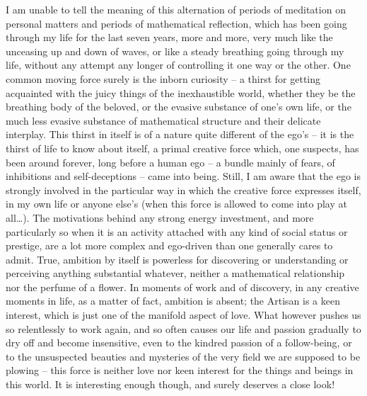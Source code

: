 I am unable to tell the meaning of this alternation of periods of
meditation on personal matters and periods of mathematical reflection,
which has been going through my life for the last seven years, more
and more, very much like the unceasing up and down of waves, or like a
steady breathing going through my life, without any attempt any longer
of controlling it one way or the other. One common moving force surely
is the inborn curiosity -- a thirst for getting acquainted with the
juicy things of the inexhaustible world, whether they be the breathing
body of the beloved, or the evasive substance of one's own life, or
the much less evasive substance of mathematical structure and their
delicate interplay. This thirst in itself is of a nature quite
different of the ego's -- it is the thirst of life to know about
itself, a primal creative force which, one suspects, has been around
forever, long before a human ego -- a bundle mainly of fears, of
inhibitions and self-deceptions -- came into being. Still, I am aware
that the ego is strongly involved in the particular way in which the
creative force expresses itself, in my own life or anyone else's (when
this force is allowed to come into play at all\ldots). The motivations
behind any strong energy investment, and more particularly so when it
is an activity attached with any kind of social status or prestige,
are a lot more complex and ego-driven than one generally cares to
admit. True, ambition by itself is powerless for discovering or
understanding or perceiving anything substantial whatever, neither a
mathematical relationship nor the perfume of a flower. In moments of
work and of discovery, in any creative moments in life, as a matter of
fact, ambition is absent; the Artisan is a keen interest, which is
just one of the manifold aspect of love. What however pushes us so
relentlessly to work again, and so often causes our life and passion
gradually to dry off and become insensitive, even to the kindred
passion of a follow-being, or to the unsuspected beauties and
mysteries of the very field we are supposed to be plowing -- this
force is neither love nor keen interest for the things and beings in
this world. It is interesting enough though, and surely deserves a
close look!

